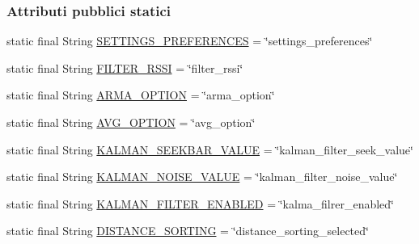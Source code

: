 \subsubsection*{Attributi pubblici statici}
\begin{DoxyCompactItemize}
\item 
static final String \hyperlink{classit_1_1unibo_1_1torsello_1_1bluetoothpositioning_1_1constant_1_1SettingConstants_ae1b406c787a7efb87d585d5c8b80493d_ae1b406c787a7efb87d585d5c8b80493d}{S\+E\+T\+T\+I\+N\+G\+S\+\_\+\+P\+R\+E\+F\+E\+R\+E\+N\+C\+ES} = \char`\"{}settings\+\_\+preferences\char`\"{}
\item 
static final String \hyperlink{classit_1_1unibo_1_1torsello_1_1bluetoothpositioning_1_1constant_1_1SettingConstants_a60a6d73ab1d42653b8a0c5b10c1c80c5_a60a6d73ab1d42653b8a0c5b10c1c80c5}{F\+I\+L\+T\+E\+R\+\_\+\+R\+S\+SI} = \char`\"{}filter\+\_\+rssi\char`\"{}
\item 
static final String \hyperlink{classit_1_1unibo_1_1torsello_1_1bluetoothpositioning_1_1constant_1_1SettingConstants_ad8f1f7986a4558736769604d606f53a1_ad8f1f7986a4558736769604d606f53a1}{A\+R\+M\+A\+\_\+\+O\+P\+T\+I\+ON} = \char`\"{}arma\+\_\+option\char`\"{}
\item 
static final String \hyperlink{classit_1_1unibo_1_1torsello_1_1bluetoothpositioning_1_1constant_1_1SettingConstants_a2c0b004552568f9813696b26b89b840c_a2c0b004552568f9813696b26b89b840c}{A\+V\+G\+\_\+\+O\+P\+T\+I\+ON} = \char`\"{}avg\+\_\+option\char`\"{}
\item 
static final String \hyperlink{classit_1_1unibo_1_1torsello_1_1bluetoothpositioning_1_1constant_1_1SettingConstants_a7ba43b29e467efb129d86c917734c94b_a7ba43b29e467efb129d86c917734c94b}{K\+A\+L\+M\+A\+N\+\_\+\+S\+E\+E\+K\+B\+A\+R\+\_\+\+V\+A\+L\+UE} = \char`\"{}kalman\+\_\+filter\+\_\+seek\+\_\+value\char`\"{}
\item 
static final String \hyperlink{classit_1_1unibo_1_1torsello_1_1bluetoothpositioning_1_1constant_1_1SettingConstants_a2751989834b974103dda417fb8b10337_a2751989834b974103dda417fb8b10337}{K\+A\+L\+M\+A\+N\+\_\+\+N\+O\+I\+S\+E\+\_\+\+V\+A\+L\+UE} = \char`\"{}kalman\+\_\+filter\+\_\+noise\+\_\+value\char`\"{}
\item 
static final String \hyperlink{classit_1_1unibo_1_1torsello_1_1bluetoothpositioning_1_1constant_1_1SettingConstants_a974ee83a6959f7965c5fa27ac8dc0798_a974ee83a6959f7965c5fa27ac8dc0798}{K\+A\+L\+M\+A\+N\+\_\+\+F\+I\+L\+T\+E\+R\+\_\+\+E\+N\+A\+B\+L\+ED} = \char`\"{}kalma\+\_\+filrer\+\_\+enabled\char`\"{}
\item 
static final String \hyperlink{classit_1_1unibo_1_1torsello_1_1bluetoothpositioning_1_1constant_1_1SettingConstants_ad86af94213ec3f11669289c4972c7658_ad86af94213ec3f11669289c4972c7658}{D\+I\+S\+T\+A\+N\+C\+E\+\_\+\+S\+O\+R\+T\+I\+NG} = \char`\"{}distance\+\_\+sorting\+\_\+selected\char`\"{}
\end{DoxyCompactItemize}


